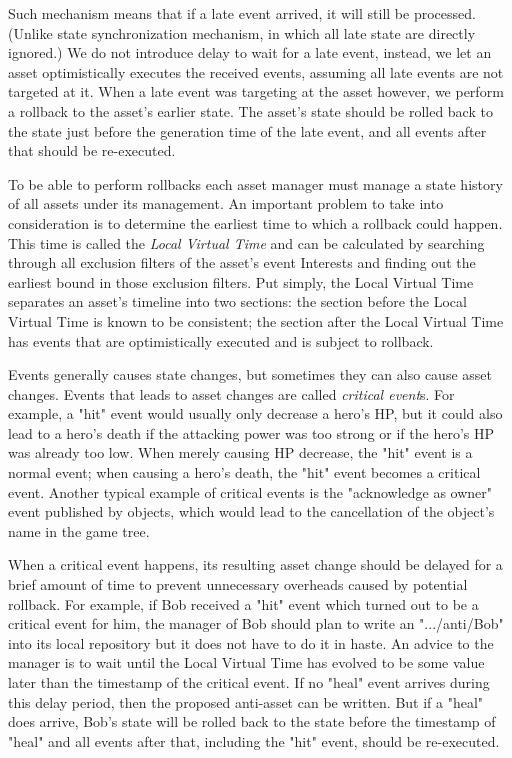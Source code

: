 Such mechanism means that if a late event arrived, it will still be processed. (Unlike state synchronization mechanism, in which all late state are directly ignored.) We do not introduce delay to wait for a late event, instead, we let an asset optimistically executes the received events, assuming all late events are not targeted at it. When a late event was targeting at the asset however, we perform a rollback to the asset's earlier state. The asset's state should be rolled back to the state just before the generation time of the late event, and all events after that should be re-executed. 

To be able to perform rollbacks each asset manager must manage a state history of all assets under its management. An important problem to take into consideration is to determine the earliest time to which a rollback could happen. This time is called the \emph{Local Virtual Time} and can be calculated by searching through all exclusion filters of the asset's event Interests and finding out the earliest bound in those exclusion filters. Put simply, the Local Virtual Time separates an asset's timeline into two sections: the section before the Local Virtual Time is known to be consistent; the section after the Local Virtual Time has events that are optimistically executed and is subject to rollback.

Events generally causes state changes, but sometimes they can also cause asset changes. Events that leads to asset changes are called \emph{critical event}s. For example, a "{hit}" event would usually only decrease a hero's HP, but it could also lead to a hero's death if the attacking power was too strong or if the hero's HP was already too low. When merely causing HP decrease, the "{hit}" event is a normal event; when causing a hero's death, the "{hit}" event becomes a critical event. Another typical example of critical events is the "{acknowledge as owner}" event published by objects, which would lead to the cancellation of the object's name in the game tree. 

When a critical event happens, its resulting asset change should be delayed for a brief amount of time to prevent unnecessary overheads caused by potential rollback. For example, if Bob received a "{hit}" event which turned out to be a critical event for him, the manager of Bob should plan to write an "{.../anti/Bob}" into its local repository but it does not have to do it in haste. An advice to the manager is to wait until the Local Virtual Time has evolved to be some value later than the timestamp of the critical event. If no "{heal}" event arrives during this delay period, then the proposed anti-asset can be written. But if a "{heal}" does arrive, Bob's state will be rolled back to the state before the timestamp of "{heal}" and all events after that, including the "{hit}" event, should be re-executed.

